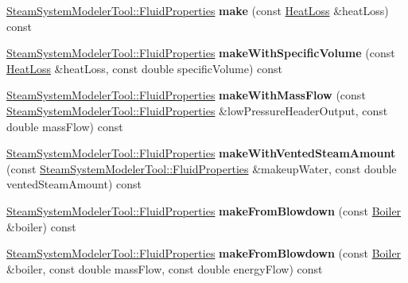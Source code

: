 \begin{DoxyCompactItemize}
\item 
\mbox{\label{class_fluid_properties_factory_a6222ece1469cd7b208a90bd65702b431}} 
\hyperlink{struct_steam_system_modeler_tool_1_1_fluid_properties}{Steam\+System\+Modeler\+Tool\+::\+Fluid\+Properties} {\bfseries make} (const \hyperlink{class_heat_loss}{Heat\+Loss} \&heat\+Loss) const
\item 
\mbox{\label{class_fluid_properties_factory_a37d6381e37993134fbbb26436f07cf27}} 
\hyperlink{struct_steam_system_modeler_tool_1_1_fluid_properties}{Steam\+System\+Modeler\+Tool\+::\+Fluid\+Properties} {\bfseries make\+With\+Specific\+Volume} (const \hyperlink{class_heat_loss}{Heat\+Loss} \&heat\+Loss, const double specific\+Volume) const
\item 
\mbox{\label{class_fluid_properties_factory_a7371b3ddc062eaa2d15ff003fd1d1faa}} 
\hyperlink{struct_steam_system_modeler_tool_1_1_fluid_properties}{Steam\+System\+Modeler\+Tool\+::\+Fluid\+Properties} {\bfseries make\+With\+Mass\+Flow} (const \hyperlink{struct_steam_system_modeler_tool_1_1_fluid_properties}{Steam\+System\+Modeler\+Tool\+::\+Fluid\+Properties} \&low\+Pressure\+Header\+Output, const double mass\+Flow) const
\item 
\mbox{\label{class_fluid_properties_factory_aae22a8312f9eed7130e5178a1556a776}} 
\hyperlink{struct_steam_system_modeler_tool_1_1_fluid_properties}{Steam\+System\+Modeler\+Tool\+::\+Fluid\+Properties} {\bfseries make\+With\+Vented\+Steam\+Amount} (const \hyperlink{struct_steam_system_modeler_tool_1_1_fluid_properties}{Steam\+System\+Modeler\+Tool\+::\+Fluid\+Properties} \&makeup\+Water, const double vented\+Steam\+Amount) const
\item 
\mbox{\label{class_fluid_properties_factory_a8f695ab1e219c872a308598ef99d63d2}} 
\hyperlink{struct_steam_system_modeler_tool_1_1_fluid_properties}{Steam\+System\+Modeler\+Tool\+::\+Fluid\+Properties} {\bfseries make\+From\+Blowdown} (const \hyperlink{class_boiler}{Boiler} \&boiler) const
\item 
\mbox{\label{class_fluid_properties_factory_a29f4d516c2f7a4780b1acaec8d39f77f}} 
\hyperlink{struct_steam_system_modeler_tool_1_1_fluid_properties}{Steam\+System\+Modeler\+Tool\+::\+Fluid\+Properties} {\bfseries make\+From\+Blowdown} (const \hyperlink{class_boiler}{Boiler} \&boiler, const double mass\+Flow, const double energy\+Flow) const

\end{DoxyCompactItemize}
